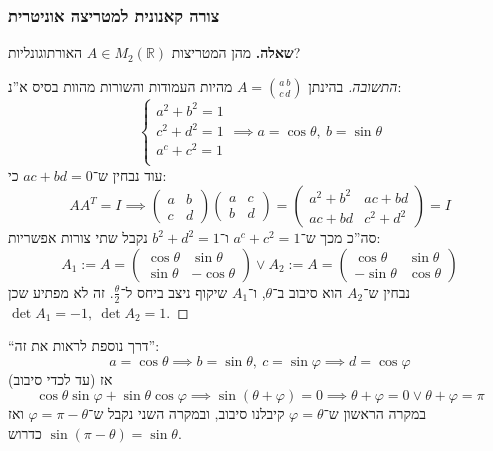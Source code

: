 \documentclass[a4paper]{article}
\newcommand\R     {\mathbb{R}}
\newcommand\vphi  {\varphi}
\newcommand\ta    {\theta}
\newcommand\pms[1]    {\begin{pmatrix}
		#1
\end{pmatrix}}
\renewcommand\phi     {\varphi}
\theoremstyle{definition}
\begin{document}
	\subsubsection{צורה קאנונית למטריצה אוניטרית}
	\textbf{שאלה. }מהן המטריצות $A \in M_2(\R)$ האורתוגונליות? \begin{proof}[התשובה]
		בהינתן $A = \binom{a\, b}{c\, d}$ מהיות העמודות והשורות מהוות בסיס א''נ:
		\[ \begin{cases}
			a^2 + b^2 = 1 \\
			c^2 + d^2 = 1 \\
			a^c + c^2 = 1 \\
		\end{cases} \implies a = \cos\ta, \ b = \sin\ta \]
		עוד נבחין ש־$ac + bd = 0$ כי: 
		\[ AA^T = I \implies \pms{a & b \\ c & d}\pms{a & c \\ b & d} = \pms{a^2 + b^2 & ac + bd \\ ac + bd & c^2 + d^2} = I \]
		סה''כ מכך ש־$a^c + c^2 = 1$ ו־$b^2 + d^2 = 1$ נקבל שתי צורות אפשריות: 
		\[ A_1:= A = \pms{\cos\ta & \sin\ta \\ \sin\ta & -\cos\ta} \lor A_2:= A = \pms{\cos\ta&\sin\ta \\ -\sin\ta & \cos\ta} \]
		נבחין ש־$A_2$ הוא סיבוב ב־$\ta$, ו־$A_1$ שיקוף ניצב ביחס ל־$\frac{\ta}{2}$. זה לא מפתיע שכן $\det A_1 = -1, \ \det A_2 = 1$. 	
	\end{proof}
	``דרך נוספת לראות את זה'': 
	\[ a = \cos\ta \implies b = \sin\ta, \ c = \sin\vphi \implies d = \cos\vphi \]
	אז (עד לכדי סיבוב)
	\[ \cos\ta \sin\vphi + \sin\ta \cos\vphi \implies \sin(\ta + \phi) = 0 \implies \ta + \phi = 0 \lor \ta + \phi = \pi \]
	במקרה הראשון ש־$\phi = \ta$ קיבלנו סיבוב, ובמקרה השני נקבל ש־$\vphi = \pi - \ta$ ואז $\sin(\pi - \ta) = \sin \ta$ כדרוש. 
	
\end{document}

